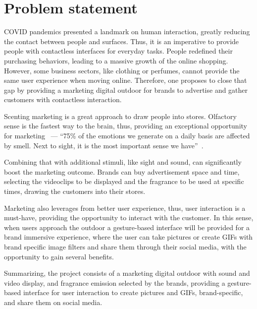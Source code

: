 \section{Problem statement}
\label{sec:prob-stat}
%

COVID pandemics presented a landmark on human interaction, greatly reducing the
contact between people and surfaces. Thus, it is an imperative to provide people
with contactless interfaces for everyday tasks. People redefined their
purchasing behaviors, leading to a massive growth of the online
shopping. However, some business sectors, like clothing or perfumes, cannot
provide the same user experience when moving online.
Therefore, one proposes to close that gap by providing a marketing digital
outdoor for brands to advertise and gather customers with contactless
interaction.

Scenting marketing is a great approach to draw people into stores.
Olfactory sense is the fastest way to the brain, thus, providing an exceptional
opportunity for marketing~\cite{news-harvard} --- ``75\% of the emotions we generate on a daily basis are affected by smell. Next
to sight, it is the most important sense we have''~\cite{lindstrom2006brand}.

Combining that with additional stimuli, like sight and sound, can
significantly boost the marketing outcome. Brands can buy advertisement space
and time, selecting the videoclips to be displayed and the fragrance to be
used at specific times, drawing the customers into their stores.

Marketing also leverages from better user experience, thus, user interaction is
a must-have, providing the opportunity to interact with the customer. In this
sense, when users approach the outdoor a gesture-based interface will be
provided for a brand immersive experience, where the user can take pictures or
create GIFs with brand specific image filters and share them through their
social media, with the opportunity to gain several benefits.

Summarizing, the project consists of a marketing digital outdoor with sound and
video display, and fragrance emission selected by the brands, providing a gesture-based interface for
user interaction to create pictures and GIFs, brand-specific, and share them on social media. 
